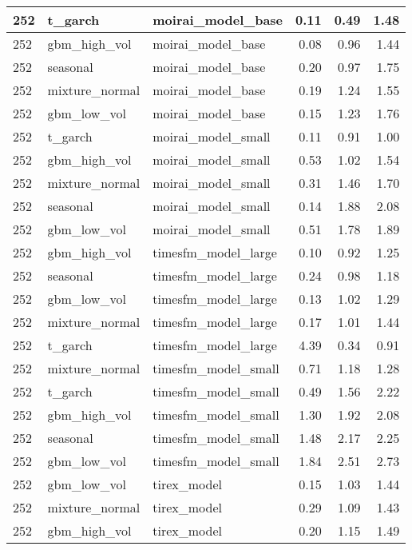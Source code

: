 {\begin{tabular}{lllrrr}
\midrule
252 & t\_garch & moirai\_model\_base & 0.11 & 0.49 & 1.48 \\
\midrule
252 & gbm\_high\_vol & moirai\_model\_base & 0.08 & 0.96 & 1.44 \\
\midrule
252 & seasonal & moirai\_model\_base & 0.20 & 0.97 & 1.75 \\
\midrule
252 & mixture\_normal & moirai\_model\_base & 0.19 & 1.24 & 1.55 \\
\midrule
252 & gbm\_low\_vol & moirai\_model\_base & 0.15 & 1.23 & 1.76 \\
\midrule
252 & t\_garch & moirai\_model\_small & 0.11 & 0.91 & 1.00 \\
\midrule
252 & gbm\_high\_vol & moirai\_model\_small & 0.53 & 1.02 & 1.54 \\
\midrule
252 & mixture\_normal & moirai\_model\_small & 0.31 & 1.46 & 1.70 \\
\midrule
252 & seasonal & moirai\_model\_small & 0.14 & 1.88 & 2.08 \\
\midrule
252 & gbm\_low\_vol & moirai\_model\_small & 0.51 & 1.78 & 1.89 \\
\midrule
252 & gbm\_high\_vol & timesfm\_model\_large & 0.10 & 0.92 & 1.25 \\
\midrule
252 & seasonal & timesfm\_model\_large & 0.24 & 0.98 & 1.18 \\
\midrule
252 & gbm\_low\_vol & timesfm\_model\_large & 0.13 & 1.02 & 1.29 \\
\midrule
252 & mixture\_normal & timesfm\_model\_large & 0.17 & 1.01 & 1.44 \\
\midrule
252 & t\_garch & timesfm\_model\_large & 4.39 & 0.34 & 0.91 \\
\midrule
252 & mixture\_normal & timesfm\_model\_small & 0.71 & 1.18 & 1.28 \\
\midrule
252 & t\_garch & timesfm\_model\_small & 0.49 & 1.56 & 2.22 \\
\midrule
252 & gbm\_high\_vol & timesfm\_model\_small & 1.30 & 1.92 & 2.08 \\
\midrule
252 & seasonal & timesfm\_model\_small & 1.48 & 2.17 & 2.25 \\
\midrule
252 & gbm\_low\_vol & timesfm\_model\_small & 1.84 & 2.51 & 2.73 \\
\midrule
252 & gbm\_low\_vol & tirex\_model & 0.15 & 1.03 & 1.44 \\
\midrule
252 & mixture\_normal & tirex\_model & 0.29 & 1.09 & 1.43 \\
\midrule
252 & gbm\_high\_vol & tirex\_model & 0.20 & 1.15 & 1.49 \\

\end{tabular}}
